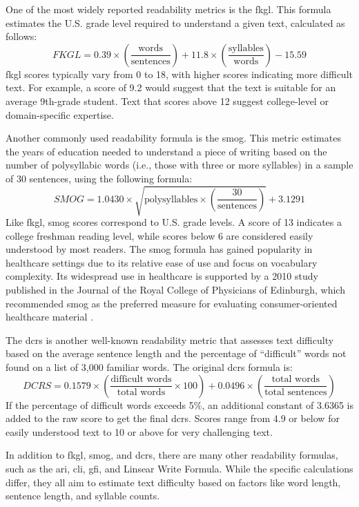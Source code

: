 One of the most widely reported readability metrics is the \gls{fkgl}. This formula estimates the U.S. grade level required to understand a given text, calculated as follows:
$$FKGL = 0.39 \times \left(\frac{\text{words}}{\text{sentences}}\right) + 11.8 \times \left(\frac{\text{syllables}}{\text{words}}\right) - 15.59$$
\gls{fkgl} scores typically vary from 0 to 18, with higher scores indicating more difficult text. For example, a score of 9.2 would suggest that the text is suitable for an average 9th-grade student. Text that scores above 12 suggest college-level or domain-specific expertise.

Another commonly used readability formula is the \gls{smog}. 
This metric estimates the years of education needed to understand a piece of writing based on the number of polysyllabic words (i.e., those with three or more syllables) in a sample of 30 sentences, using the following formula:
$$SMOG = 1.0430 \times \sqrt{\text{polysyllables} \times \left(\frac{30}{\text{sentences}}\right)} + 3.1291$$
Like \gls{fkgl}, \gls{smog} scores correspond to U.S. grade levels. A score of 13 indicates a college freshman reading level, while scores below 6 are considered easily understood by most readers. The \gls{smog} formula has gained popularity in healthcare settings due to its relative ease of use and focus on vocabulary complexity. Its widespread use in healthcare is supported by a 2010 study published in the Journal of the Royal College of Physicians of Edinburgh, which recommended \gls{smog} as the preferred measure for evaluating consumer-oriented healthcare material \cite{Fitzsimmons2010-mq}.

The \gls{dcrs} is another well-known readability metric that assesses text difficulty based on the average sentence length and the percentage of ``difficult'' words not found on a list of 3,000 familiar words. The original \gls{dcrs} formula is:
$$DCRS = 0.1579 \times \left(\frac{\text{difficult words}}{\text{total words}} \times 100\right) + 0.0496 \times \left(\frac{\text{total words}}{\text{total sentences}}\right)$$
If the percentage of difficult words exceeds 5\%, an additional constant of 3.6365 is added to the raw score to get the final \gls{dcrs}. Scores range from 4.9 or below for easily understood text to 10 or above for very challenging text.

In addition to \gls{fkgl}, \gls{smog}, and \gls{dcrs}, there are many other readability formulas, such as the \gls{ari}, \gls{cli}, \gls{gfi}, and Linsear Write Formula. While the specific calculations differ, they all aim to estimate text difficulty based on factors like word length, sentence length, and syllable counts.

